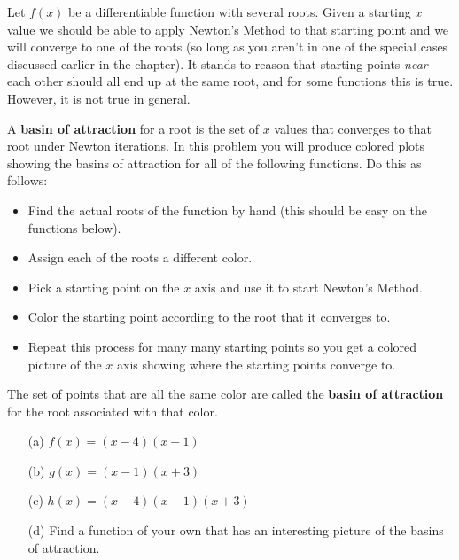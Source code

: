 \begin{problem}
    Let $f(x)$ be a differentiable function with several roots.  Given a starting $x$
    value we should be able to apply Newton's Method to that starting point and we will
    converge to one of the roots (so long as you aren't in one of the special cases
    discussed earlier in the chapter).  It stands to reason that starting points {\it
    near} each other should all end up at the same root, and for some functions this is
    true.  However, it is not true in general.  

    A {\bf basin of attraction} for a root is the set of $x$ values that converges to that
    root under Newton iterations.  In this problem you will produce colored plots showing
    the basins of attraction for all of the following functions.  Do this as follows:
    \begin{itemize}
        \item Find the actual roots of the function by hand (this should be easy on the
            functions below).  
        \item Assign each of the roots a different color.
        \item Pick a starting point on the $x$ axis and use it to start Newton's Method.
        \item Color the starting point according to the root that it converges to.
        \item Repeat this process for many many starting points so you get a colored
            picture of the $x$ axis showing where the starting points converge to.
    \end{itemize}
    The set of points that are all the same color are called the {\bf basin of attraction}
    for the root associated with that color.

    \begin{enumerate}
        \item[(a)] $f(x) = (x-4)(x+1)$
        \item[(b)] $g(x) = (x-1)(x+3)$
        \item[(c)] $h(x) = (x-4)(x-1)(x+3)$
        \item[(d)] Find a function of your own that has an interesting picture of the
            basins of attraction.
    \end{enumerate}

\end{problem}


